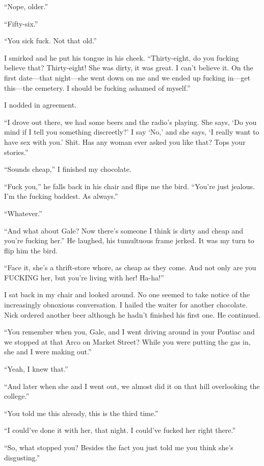 ``Nope, older.''

``Fifty-six.''

``You sick fuck. Not that old.''

I smirked and he put his tongue in his cheek. ``Thirty-eight, do you
fucking believe that? Thirty-eight! She was dirty, it was great. I can't
believe it. On the first date---that night---she went down on me and we
ended up fucking in---get this---the cemetery. I should be fucking
ashamed of myself.''

I nodded in agreement.

``I drove out there, we had some beers and the radio's playing. She
says, `Do you mind if I tell you something discreetly?' I say `No,' and
she says, `I really want to have sex with you.' Shit. Has any woman ever
asked you like that? Tops your stories.''

``Sounds cheap,'' I finished my chocolate.

``Fuck you,'' he falls back in his chair and flips me the bird. ``You're
just jealous. I'm the fucking baddest. As always.''

``Whatever.''

``And what about Gale? Now there's someone I think is dirty and cheap
and you're fucking her.'' He laughed, his tumultuous frame jerked. It
was my turn to flip him the bird.

``Face it, she's a thrift-store whore, as cheap as they come. And not
only are you FUCKING her, but you're living with her! Ha-ha!''

I sat back in my chair and looked around. No one seemed to take notice
of the increasingly obnoxious conversation. I hailed the waiter for
another chocolate. Nick ordered another beer although he hadn't finished
his first one. He continued.

``You remember when you, Gale, and I went driving around in your Pontiac
and we stopped at that Arco on Market Street? While you were putting the
gas in, she and I were making out.''

``Yeah, I knew that.''

``And later when she and I went out, we almost did it on that hill
overlooking the college.''

``You told me this already, this is the third time.''

``I could've done it with her, that night. I could've fucked her right
there.''

``So, what stopped you? Besides the fact you just told me you think
she's disgusting.''

